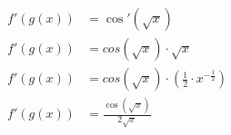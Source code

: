 \documentclass[preview]{standalone}
\begin{document}
\begin{align*}
f'(g(x))&= \cos'(\sqrt{x}) \\ f'(g(x))&=cos(\sqrt{x}) \cdot \sqrt{x} \\ f'(g(x))&=cos(\sqrt{x}) \cdot (\frac{1}{2} \cdot x^{-\frac{1}{2}}) \\ f'(g(x))&=\frac{\cos(\sqrt{x})}{2\sqrt{x}}
\end{align*}
\end{document}

